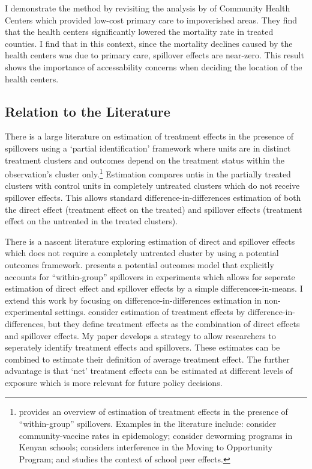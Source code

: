 \documentclass[11pt]{article}
\begin{document}
I demonstrate the method by revisiting the analysis by \citet{Bailey_Goodman_Bacon_2015} of Community Health Centers which provided low-cost primary care to impoverished areas. They find that the health centers significantly lowered the mortality rate in treated counties. I find that in this context, since the mortality declines caused by the health centers was due to primary care, spillover effects are near-zero. This result shows the importance of accessability concerns when deciding the location of the health centers.

\subsection{Relation to the Literature} 

There is a large literature on estimation of treatment effects in the presence of spillovers using a `partial identification' framework where units are in distinct treatment clusters and outcomes depend on the treatment status within the observation's cluster only.\footnote{ \citet{Angelucci_DiMaro_2016} provides an overview of estimation of treatment effects in the presence of ``within-group'' spillovers. Examples in the literature include: \citet{Halloran_Struchiner_1995} consider community-vaccine rates in epidemology; \citet{Miguel_Kremer_2004} consider deworming programs in Kenyan schools; \citet{Sobel_2006} considers interference in the Moving to Opportunity Program; and \citet{Angrist_2014} studies the context of school peer effects.} Estimation compares untis in the partially treated clusters with control units in completely untreated clusters which do not receive spillover effects. This allows standard difference-in-differences estimation of both the direct effect (treatment effect on the treated) and spillover effects (treatment effect on the untreated in the treated clusters). 

There is a nascent literature exploring estimation of direct and spillover effects which does not require a completely untreated cluster by using a potential outcomes framework. \citet{Vazquez-Bare_2019} presents a potential outcomes model that explicitly accounts for ``within-group'' spillovers in experiments which allows for seperate estimation of direct effect and spillover effects by a simple differences-in-means. I extend this work by focusing on difference-in-differences estimation in non-experimental settings.  \citet{Sävje_Aronow_Hudgens_2019} consider estimation of treatment effects by difference-in-differences, but they define treatment effects as the combination of direct effects and spillover effects. My paper develops a strategy to allow researchers to seperately identify treatment effects and spillovers. These estimates can be combined to estimate their definition of average treatment effect. The further advantage is that `net' treatment effects can be estimated at different levels of exposure which is more relevant for future policy decisions.
\end{document}
